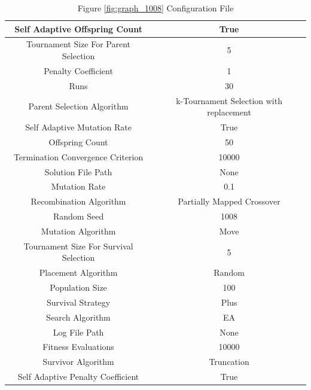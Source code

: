 \documentclass{standalone}
\begin{document}
\begin{table}[!htb]
	\centering
	\caption{Figure \ref{fig:graph_1008} Configuration File}
	\label{tab:graph_1008}
	\begin{tabular}{| c | c |}
		\hline
		Self Adaptive Offspring Count		& True		 \\
		\hline
		Tournament Size For Parent Selection		& 5		 \\
		\hline
		Penalty Coefficient		& 1		 \\
		\hline
		Runs		& 30		 \\
		\hline
		Parent Selection Algorithm		& k-Tournament Selection with replacement		 \\
		\hline
		Self Adaptive Mutation Rate		& True		 \\
		\hline
		Offspring Count		& 50		 \\
		\hline
		Termination Convergence Criterion		& 10000		 \\
		\hline
		Solution File Path		& None		 \\
		\hline
		Mutation Rate		& 0.1		 \\
		\hline
		Recombination Algorithm		& Partially Mapped Crossover		 \\
		\hline
		Random Seed		& 1008		 \\
		\hline
		Mutation Algorithm		& Move		 \\
		\hline
		Tournament Size For Survival Selection		& 5		 \\
		\hline
		Placement Algorithm		& Random		 \\
		\hline
		Population Size		& 100		 \\
		\hline
		Survival Strategy		& Plus		 \\
		\hline
		Search Algorithm		& EA		 \\
		\hline
		Log File Path		& None		 \\
		\hline
		Fitness Evaluations		& 10000		 \\
		\hline
		Survivor Algorithm		& Truncation		 \\
		\hline
		Self Adaptive Penalty Coefficient		& True		 \\
		\hline
	\end{tabular}
\end{table}
\end{document}
